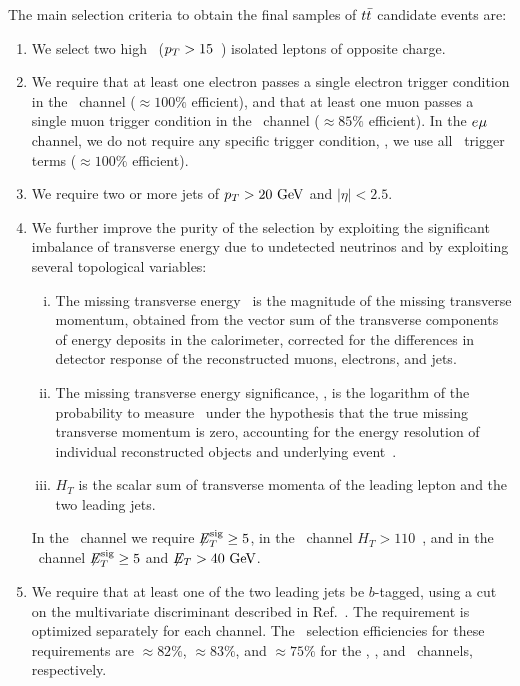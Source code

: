 \documentclass[aps,prd,twocolumn,showpacs,superscriptaddress,groupedaddress,floatfix]{revtex4}
\begin{document}
The  main selection criteria to obtain the final samples of $t\bar{t}$ candidate events are: \begin{enumerate}


\item We  select two high \pt\ ($\mbox{$p_T$} >15$~\gev) isolated leptons of opposite charge. 

\item We require that at least one electron passes a single electron trigger condition in the \ee\ channel ($\approx 100\%$ efficient),
and that at least one muon passes a  single muon trigger condition in the \mumu\ channel ($\approx 85\%$ efficient).
In the  $e\mu$ channel,
we do not require any specific trigger condition, \ie, we use all \dzero\ trigger terms ($\approx 100\%$ efficient).

 




\item We require  two or more jets of $\mbox{$p_T$}>20\ \mathrm{GeV}$ and $|\eta|<2.5$.

\item We further improve the purity of the selection by exploiting the significant imbalance of transverse energy due to undetected neutrinos and
by exploiting 
several topological variables:
\begin{enumerate}[(i)]
\item The missing transverse energy \met\
is the magnitude of the missing transverse momentum, 
obtained from the vector sum of the transverse
components of energy deposits in the calorimeter, corrected for
the differences in detector response of the reconstructed muons, electrons, and jets. 
\item
The missing transverse energy significance, \metsig,
is  the logarithm of the probability to measure \met\ under the hypothesis that the true missing transverse momentum is zero,
accounting for the energy resolution of individual reconstructed objects and underlying event~\cite{metsig_thesis}.
\item
$H_T$ is the scalar sum of transverse momenta of the leading lepton and the two leading jets.
\end{enumerate}
In the \ee\ channel
we require 
$\mbox{$\not\!\!E_T^{\text{sig}}$}\ge 5$, in the \emu\ channel
$H_T>110$~\gev, and
in the \mumu\ channel
$\mbox{$\not\!\!E_T^{\text{sig}}$}\ge 5$ and $\mbox{$\not\!\!E_T$}>40~\mathrm{GeV}$.


\item 
We require that at least one of the two leading jets  be $b$-tagged,
using a cut on the
multivariate discriminant described in Ref.~\cite{NIM_btaging}.
The requirement is optimized separately for each channel.
The \ttbar\ selection  efficiencies for these requirements are $\approx 82\%$,
$ \approx 83\%$, and 
$ \approx 75\%$
for  the \ee, \emu, and \mumu\ channels, respectively.




\end{enumerate}
\end{document}
